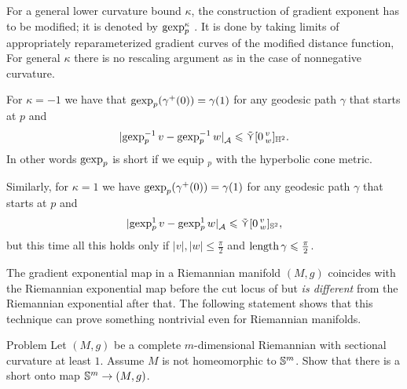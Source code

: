For a general lower curvature bound $\kappa$, the construction of gradient exponent has to be modified;
it is denoted by $\operatorname{\rm gexp}\nolimits_p^\kappa$ \cite[16.36]{alexander-kapovitch-petrunin2024}. It is done by taking limits of appropriately reparameterized gradient curves of  the modified distance function, For general $\kappa$ there is no rescaling argument as in the case of nonnegative curvature.

For $\kappa=-1$ we have 
that $\operatorname{\rm gexp}\nolimits_p(\gamma^+(0))=\gamma(1)$
for any geodesic path $\gamma$ that starts at $p$
and 
\[|{\operatorname{\rm gexp}\nolimits_p^{-1}v}-{\operatorname{\rm gexp}\nolimits_p^{-1}w}|_{\mathcal{A}}^{{}}\leqslant \mathop{\tilde\curlyvee}\nolimits[0\,{}^{v}_{w}]_{\mathbb{H}^2}.\]
In other words $\operatorname{\rm gexp}\nolimits_p$ is short if we equip $_p$ with the hyperbolic cone metric.

Similarly, for $\kappa=1$ we have $\operatorname{\rm gexp}\nolimits_p(\gamma^+(0))=\gamma(1)$
for any geodesic path $\gamma$ that starts at $p$ and 
\[|{\operatorname{\rm gexp}\nolimits_p^{1}v}-{\operatorname{\rm gexp}\nolimits_p^{1}w}|_{\mathcal{A}}^{{}}\leqslant \mathop{\tilde\curlyvee}\nolimits[0\,{}^{v}_{w}]_{\mathbb{S}^2},\]
but this time all this holds only if $|v|,|w|\le\tfrac\pi2$ and $\mathop{\rm length}\nolimits\gamma\leqslant\tfrac\pi2$.

The gradient exponential map in a Riemannian manifold $(M,g)$ coincides with the Riemannian exponential map before the cut locus of but \textit{is different} from the  Riemannian exponential after that.
The following statement shows that this technique can prove something nontrivial even for Riemannian manifolds.

\begin{thm}{Problem}
Let $(M,g)$ be a complete $m$-dimensional Riemannian with sectional curvature at least $1$.
Assume $M$ is not homeomorphic to $\mathbb{S}^m$.
Show that there is a short onto map $\mathbb{S}^m\to (M,g)$.
\end{thm}


